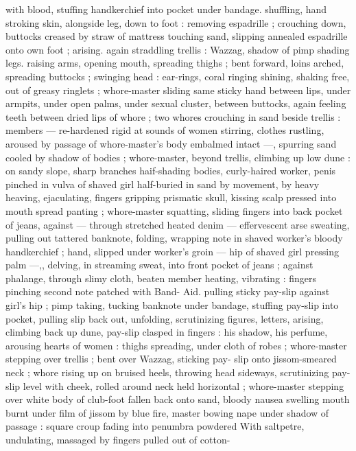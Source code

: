 with blood, stuffing handkerchief into pocket under bandage. 
shuffling, hand stroking skin, alongside leg, down to foot : removing 
espadrille ; crouching down, buttocks creased by straw of mattress 
touching sand, slipping annealed espadrille onto own foot ; arising. 
again straddling trellis : Wazzag, shadow of pimp shading legs. 
raising arms, opening mouth, spreading thighs ; bent forward, loins 
arched, spreading buttocks ; swinging head : ear-rings, coral ringing 
shining, shaking free, out of greasy ringlets ; whore-master sliding 
same sticky hand between lips, under armpits, under open palms, 
under sexual cluster, between buttocks, again feeling teeth between 
dried lips of whore ; two whores crouching in sand beside trellis : 
members --- re-hardened rigid at sounds of women stirring, clothes 
rustling, aroused by passage of whore-master's body embalmed 
intact ---, spurring sand cooled by shadow of bodies ; whore-master, 
beyond trellis, climbing up low dune : on sandy slope, sharp 
branches haif-shading bodies, curly-haired worker, penis pinched in 
vulva of shaved girl half-buried in sand by movement, by heavy 
heaving, ejaculating, fingers gripping prismatic skull, kissing scalp 
pressed into mouth spread panting ; whore-master squatting, sliding 
fingers into back pocket of jeans, against --- through stretched 
heated denim --- effervescent arse sweating, pulling out tattered 
banknote, folding, wrapping note in shaved worker's bloody 
handkerchief ; hand, slipped under worker's groin --- hip of shaved 
girl pressing palm ---,, delving, in streaming sweat, into front pocket 
of jeans ; against phalange, through slimy cloth, beaten member 
heating, vibrating : fingers pinching second note patched with Band- 
Aid. pulling sticky pay-slip against girl's hip ; pimp taking, tucking 
banknote under bandage, stuffing pay-slip into pocket, pulling slip 
back out, unfolding, scrutinizing figures, letters, arising, climbing 
back up dune, pay-slip clasped in fingers : his shadow, his perfume, 
arousing hearts of women : thighs spreading, under cloth of robes ; 
whore-master stepping over trellis ; bent over Wazzag, sticking pay- 
slip onto jissom-smeared neck ; whore rising up on bruised heels, 
throwing head sideways, scrutinizing pay-slip level with cheek, rolled 
around neck held horizontal ; whore-master stepping over white body 
of club-foot fallen back onto sand, bloody nausea swelling mouth 
burnt under film of jissom by blue fire, master bowing nape under 
shadow of passage : square croup fading into penumbra powdered 
With saltpetre, undulating, massaged by fingers pulled out of cotton- 
